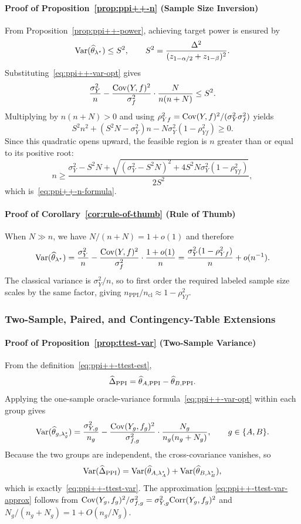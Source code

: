 \paragraph{Proof of Proposition~\ref{prop:ppi++-n} (Sample Size Inversion)}
\label{sec:proof-ppi++-n}
From Proposition~\ref{prop:ppi++-power}, achieving target power is ensured by
\[
\mathrm{Var}(\widehat{\theta}_{\lambda^\star}) \le S^2,
\qquad
S^2 = \frac{\Delta^2}{(z_{1-\alpha/2}+z_{1-\beta})^2}.
\]
Substituting~\eqref{eq:ppi++-var-opt} gives
\[
\frac{\sigma_Y^2}{n}
- \frac{\mathrm{Cov}(Y,f)^2}{\sigma_f^2}\cdot\frac{N}{n(n+N)}
\le S^2.
\]
Multiplying by $n(n+N)>0$ and using
$\rho_{Yf}^2=\mathrm{Cov}(Y,f)^2/(\sigma_Y^2\sigma_f^2)$ yields
\[
S^2 n^2 + (S^2N-\sigma_Y^2)n - N\sigma_Y^2(1-\rho_{Yf}^2)\ge 0.
\]
Since this quadratic opens upward, the feasible region is $n$ greater than or
equal to its positive root:
\[
n \ge
\frac{\sigma_Y^2 - S^2 N
+ \sqrt{(\sigma_Y^2 - S^2 N)^2
+ 4 S^2 N \sigma_Y^2 (1-\rho_{Yf}^2)}}{2S^2},
\]
which is~\eqref{eq:ppi++-n-formula}.

\paragraph{Proof of Corollary~\ref{cor:rule-of-thumb} (Rule of Thumb)}
When $N \gg n$, we have $N/(n+N)=1+o(1)$ and therefore
\[
\mathrm{Var}(\widehat{\theta}_{\lambda^\star})
= \frac{\sigma_Y^2}{n}
- \frac{\mathrm{Cov}(Y,f)^2}{\sigma_f^2}\cdot\frac{1+o(1)}{n}
= \frac{\sigma_Y^2(1-\rho_{Yf}^2)}{n} + o(n^{-1}).
\]
The classical variance is $\sigma_Y^2/n$, so to first order the required
labeled sample size scales by the same factor, giving
$n_{\mathrm{PPI}}/n_{\mathrm{cl}} \approx 1-\rho_{Yf}^2$.

\subsubsection{Two-Sample, Paired, and Contingency-Table Extensions}
\label{sec:proofs-extensions}

\paragraph{Proof of Proposition~\ref{prop:ttest-var} (Two-Sample Variance)}
\label{sec:proof-ttest}
From the definition~\eqref{eq:ppi++-ttest-est},
\[
\widehat{\Delta}_{\mathrm{PPI}}
= \widehat{\theta}_{A,\mathrm{PPI}}-\widehat{\theta}_{B,\mathrm{PPI}}.
\]
Applying the one-sample oracle-variance formula~\eqref{eq:ppi++-var-opt}
within each group gives
\[
\mathrm{Var}(\widehat{\theta}_{g,\lambda_g^\star})
=
\frac{\sigma_{Y,g}^2}{n_g}
- \frac{\mathrm{Cov}(Y_g,f_g)^2}{\sigma_{f,g}^2}
\cdot \frac{N_g}{n_g(n_g+N_g)},
\qquad g\in\{A,B\}.
\]
Because the two groups are independent, the cross-covariance vanishes, so
\[
\mathrm{Var}(\widehat{\Delta}_{\mathrm{PPI}})
= \mathrm{Var}(\widehat{\theta}_{A,\lambda_A^\star})
+ \mathrm{Var}(\widehat{\theta}_{B,\lambda_B^\star}),
\]
which is exactly~\eqref{eq:ppi++-ttest-var}. The approximation
\eqref{eq:ppi++-ttest-var-approx} follows from
$\mathrm{Cov}(Y_g,f_g)^2/\sigma_{f,g}^2 = \sigma_{Y,g}^2\mathrm{Corr}(Y_g,f_g)^2$ and
$N_g/(n_g+N_g)=1+O(n_g/N_g)$.

